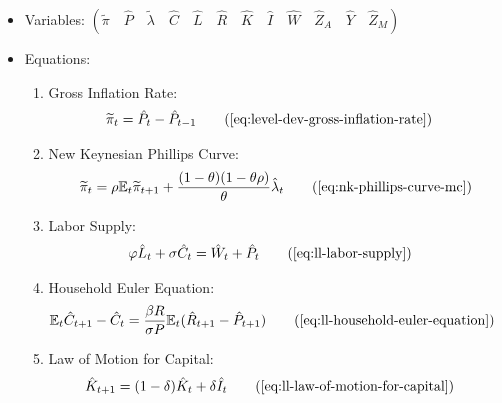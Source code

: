 \documentclass[
	12pt,
	]{article}
\numberwithin{equation}{section}
\DeclareMathOperator{\dif}{d}
\newcommand{\E}[1][t]{{\mathbb{E}_{#1}}}
\theoremstyle{definition}
\theoremstyle{plain}
\theoremstyle{plain}
\theoremstyle{plain}
\begin{document}
{\singlespacing

\begin{itemize}
	
	\item Variables: \( \left( \tilde{\pi} \quad \hat{P} \quad \tilde{\lambda} \quad \hat{C} \quad \hat{L} \quad \hat{R} \quad \hat{K} \quad \hat{I} \quad \hat{W} \quad \hat{Z}_A \quad \hat{Y} \quad \hat{Z}_M \right) \)
	
	\item Equations:

	\begin{enumerate}
			
		\item Gross Inflation Rate:
		\begin{align}
			\widetilde{\pi}_t &= \hat{P}_t - \hat{P}_{t-1}
			\tag{\ref{eq:level-dev-gross-inflation-rate}}
		\end{align}
		
		\item New Keynesian Phillips Curve:
		\begin{align}
			\widetilde{\pi}_t = \rho \E \widetilde{\pi}_{t+1} + \frac{(1-\theta) (1- \theta \rho)}{\theta} \hat{\lambda}_t
			\tag{\ref{eq:nk-phillips-curve-mc}}
		\end{align}
	
		\item Labor Supply:
		\begin{align}
			\varphi \hat{L}_t + \sigma \hat{C}_t &= \hat{W}_t + \hat{P}_t
			\tag{\ref{eq:ll-labor-supply}}
		\end{align}
		
		\item Household Euler Equation:
		\begin{align}
			\E \hat{C}_{t+1} - \hat{C}_t &= \frac{\beta R}{\sigma P} \E(\hat{R}_{t+1} - \hat{P}_{t+1})
			\tag{\ref{eq:ll-household-euler-equation}}
		\end{align}
		
		\item Law of Motion for Capital:
		\begin{align}
			\hat{K}_{t+1} &= (1-\delta)\hat{K}_t + \delta \hat{I}_t
			\tag{\ref{eq:ll-law-of-motion-for-capital}}
		\end{align}
		
		

\end{enumerate}
\end{itemize}}
\end{document}
